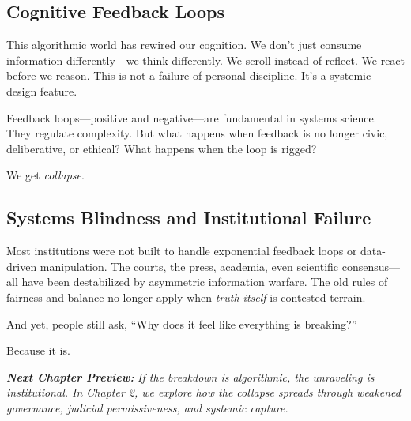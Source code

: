 \documentclass[12pt,twoside]{book}
\begin{document}
\subsection*{Cognitive Feedback Loops}\label{cognitive-feedback-loops}
This algorithmic world has rewired our cognition. We don’t just consume information differently—we think differently. We scroll instead of reflect. We react before we reason. This is not a failure of personal discipline. It’s a systemic design feature.

Feedback loops—positive and negative—are fundamental in systems science. They regulate complexity. But what happens when feedback is no longer civic, deliberative, or ethical? What happens when the loop is rigged?

We get \textit{collapse}.

\subsection*{Systems Blindness and Institutional Failure}\label{systems-blindness-and-institutional-failure}
Most institutions were not built to handle exponential feedback loops or data-driven manipulation. The courts, the press, academia, even scientific consensus—all have been destabilized by asymmetric information warfare. The old rules of fairness and balance no longer apply when \textit{truth itself} is contested terrain.

And yet, people still ask, ``Why does it feel like everything is breaking?''

Because it is.

\vspace{1em}
\noindent\textbf{\emph{Next Chapter Preview:}} \emph{If the breakdown is algorithmic, the unraveling is institutional. In Chapter 2, we explore how the collapse spreads through weakened governance, judicial permissiveness, and systemic capture.}



\end{document}
